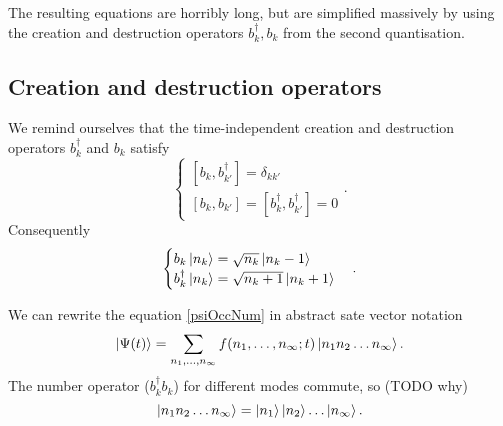 The resulting equations are horribly long, but are simplified massively by using the creation and destruction operators $b^\dagger_k, b_k$ from the second quantisation.

\subsection{Creation and destruction operators}
We remind ourselves that the time-independent creation and destruction operators $b^\dagger_k$ and $b_k$ satisfy 
\[ \begin{cases}
[b_k, b^\dagger_{k'}] = \delta_{kk'} \\
[b_k,b_{k'}] = [b_k^\dagger, b_{k'}^\dagger] = 0
\end{cases}. \]
Consequently
\[ \begin{cases}
b_k \left| n_k \right\rangle = \sqrt{n_k}\left| n_k-1 \right\rangle \\
b_k^\dagger \left| n_k \right\rangle = \sqrt{n_k+1}\left| n_k+1 \right\rangle
\end{cases}. \]

We can rewrite the equation \ref{psiOccNum} in abstract sate vector notation
\[ \left| \Psi(t) \right\rangle = \sum_{n_1,\ldots, n_\infty} f(n_1,\ldots, n_\infty;t)\left| n_1n_2\ldots n_\infty \right\rangle. \]
The number operator ($b^\dagger_k b_k$) for different modes commute, so (TODO why)
\[ \left| n_1n_2\ldots n_\infty \right\rangle = \left| n_1 \right\rangle\left| n_2 \right\rangle\ldots \left| n_\infty \right\rangle. \]

